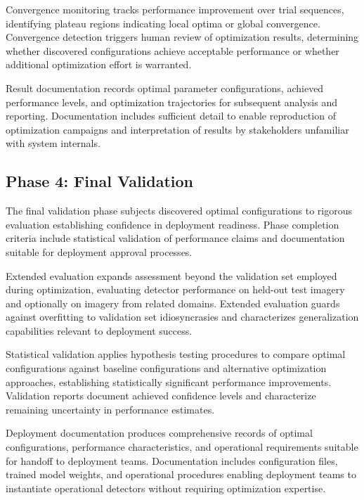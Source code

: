 Convergence monitoring tracks performance improvement over trial sequences, identifying plateau regions indicating local optima or global convergence. Convergence detection triggers human review of optimization results, determining whether discovered configurations achieve acceptable performance or whether additional optimization effort is warranted.

Result documentation records optimal parameter configurations, achieved performance levels, and optimization trajectories for subsequent analysis and reporting. Documentation includes sufficient detail to enable reproduction of optimization campaigns and interpretation of results by stakeholders unfamiliar with system internals.

\subsection{Phase 4: Final Validation}

The final validation phase subjects discovered optimal configurations to rigorous evaluation establishing confidence in deployment readiness. Phase completion criteria include statistical validation of performance claims and documentation suitable for deployment approval processes.

Extended evaluation expands assessment beyond the validation set employed during optimization, evaluating detector performance on held-out test imagery and optionally on imagery from related domains. Extended evaluation guards against overfitting to validation set idiosyncrasies and characterizes generalization capabilities relevant to deployment success.

Statistical validation applies hypothesis testing procedures to compare optimal configurations against baseline configurations and alternative optimization approaches, establishing statistically significant performance improvements. Validation reports document achieved confidence levels and characterize remaining uncertainty in performance estimates.

Deployment documentation produces comprehensive records of optimal configurations, performance characteristics, and operational requirements suitable for handoff to deployment teams. Documentation includes configuration files, trained model weights, and operational procedures enabling deployment teams to instantiate operational detectors without requiring optimization expertise.

